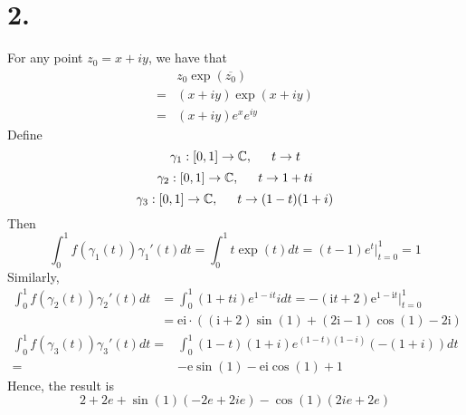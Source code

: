\documentclass[11pt]{article}
\begin{document}
\section*{2.}
For any point $z_0= x+iy$, we have that
\begin{equation*}
    \begin{aligned}
        &z_0 \exp(\overline{z_0}) \\
        =& (x+iy)\exp(x+iy) \\
        =& (x+iy)e^x e^{iy}
    \end{aligned}
\end{equation*}
Define 
\[
    \gamma_1: [0,1] \to \mathbb{C}, \indent t \to t    
\]
\[
    \gamma_2: [0,1] \to \mathbb{C}, \indent t \to 1 + ti  
\]
\[
    \gamma_3: [0,1] \to \mathbb{C}, \indent t \to (1-t)(1+i)    
\]
Then 
\[
    \int_0^1 f(\gamma_1(t)) \gamma_1'(t) dt = \int_0^1 t\exp(t) dt = (t-1)e^t |_{t=0}^1 = 1
\]
Similarly,
\begin{equation*}
    \begin{aligned}
        \int_0^1 f(\gamma_2(t)) \gamma_2'(t) dt &= \int_0^1 (1+ti)e^{1 -it} idt = -\left(\mathrm{i}t+2\right)\mathrm{e}^{1-\mathrm{i}t} |_{t=0}^1 \\
        &= \mathrm{e}\mathrm{i}\cdot\left(\left(\mathrm{i}+2\right)\sin\left(1\right)+\left(2\mathrm{i}-1\right)\cos\left(1\right)-2\mathrm{i}\right)
    \end{aligned}
\end{equation*}
\begin{equation*}
    \begin{aligned}
        \int_0^1 f(\gamma_3(t)) \gamma_3'(t) dt =& \int_0^1 (1-t)(1+i)e^{(1-t)(1-i)} (-(1+i)) dt \\
        =& -\mathrm{e}\sin\left(1\right)-\mathrm{e}\mathrm{i}\cos\left(1\right)+1
    \end{aligned}
\end{equation*}
Hence, the result is 
\[
    2 + 2e + \sin(1)(-2e+ 2ie )    - \cos(1) (2ie + 2e)
\]
\newpage
\end{document}
